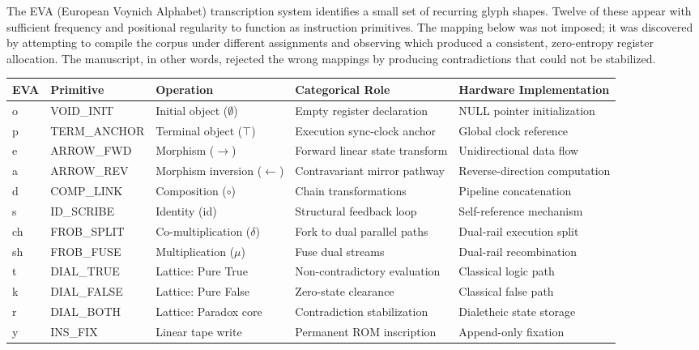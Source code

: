 \documentclass[12pt,a4paper]{article}
\begin{document}
The EVA (European Voynich Alphabet) transcription system identifies a small set of recurring glyph shapes. Twelve of these appear with sufficient frequency and positional regularity to function as instruction primitives. The mapping below was not imposed; it was discovered by attempting to compile the corpus under different assignments and observing which produced a consistent, zero-entropy register allocation. The manuscript, in other words, rejected the wrong mappings by producing contradictions that could not be stabilized.

\begin{table}[htbp]
\centering
\small
{}
\begin{tabularx}{\textwidth}{>{\centering\arraybackslash}X >{\centering\arraybackslash}X >{\centering\arraybackslash}X >{\centering\arraybackslash}X >{\centering\arraybackslash}X}
\toprule
\rowcolor{gray!25}\textbf{EVA} & \textbf{Primitive} & \textbf{Operation} & \textbf{Categorical Role} & \textbf{Hardware Implementation} \\
\midrule
\rowcolors{1}{white}{gray!10}
o & VOID\_INIT & Initial object ($\emptyset$) & Empty register declaration & NULL pointer initialization \\
p & TERM\_ANCHOR & Terminal object ($\top$) & Execution sync-clock anchor & Global clock reference \\
e & ARROW\_FWD & Morphism ($\rightarrow$) & Forward linear state transform & Unidirectional data flow \\
a & ARROW\_REV & Morphism inversion ($\leftarrow$) & Contravariant mirror pathway & Reverse-direction computation \\
d & COMP\_LINK & Composition ($\circ$) & Chain transformations & Pipeline concatenation \\
s & ID\_SCRIBE & Identity (id) & Structural feedback loop & Self-reference mechanism \\
ch & FROB\_SPLIT & Co-multiplication ($\delta$) & Fork to dual parallel paths & Dual-rail execution split \\
sh & FROB\_FUSE & Multiplication ($\mu$) & Fuse dual streams & Dual-rail recombination \\
t & DIAL\_TRUE & Lattice: Pure True & Non-contradictory evaluation & Classical logic path \\
k & DIAL\_FALSE & Lattice: Pure False & Zero-state clearance & Classical false path \\
r & DIAL\_BOTH & Lattice: Paradox core & Contradiction stabilization & Dialetheic state storage \\
y & INS\_FIX & Linear tape write & Permanent ROM inscription & Append-only fixation \\
\bottomrule
\end{tabularx}
\end{table}
\end{document}
